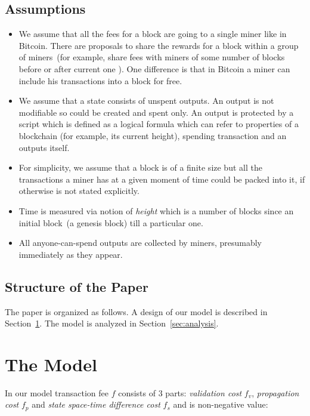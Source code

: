 \documentclass[]{llncs}   %
\newcommand{\authnote}[2]{\marginpar{\parbox{\marginparwidth}{\tiny %
  \textsf{#1 {\textcolor{blue}{notes: #2}}}}}%
  \textcolor{blue}{\textbf{\dag}}}
\newcommand{\authnote}[2]{
  \textsf{#1 \textcolor{blue}{: #2}}}
\newcommand{\authnote}[2]{}
\newcommand{\knote}[1]{{\authnote{\textcolor{green}{Alex notes}}{#1}}}
\begin{document}
\knote{note that we're talking about minimal fees}

\subsection{Assumptions}
\begin{itemize}
  \item{} We assume that all the fees for a block are going to a single miner like in Bitcoin. There are proposals to share the rewards for a block within a group of miners~(for example, share fees with miners of some number of blocks before or after current one \cite{eyal2016bitcoin,kogias2016enhancing}). One difference is that in Bitcoin a miner can include his transactions into a block for free.
  \item{} We assume that a state consists of unspent outputs. An output is not modifiable so could be created and spent only. An output is protected by a script which is defined as a logical formula which can refer to properties of a blockchain (for example, its current height), spending transaction and an outputs itself. \knote{example} 
  \item{} For simplicity, we assume that a block is of a finite size but all the transactions a miner has at a given moment of time could be packed into it, if otherwise is not stated explicitly.
  \item{} Time is measured via notion of \textit{height} which is a number of blocks since an initial block~(a genesis block) till a particular one. 
  \item{} All anyone-can-spend outputs are collected by miners, presumably immediately as they appear.
\end{itemize}

\subsection{Structure of the Paper}

The paper is organized as follows. A design of our model is described in Section~\ref{sec:model}. The model is analyzed in Section~\ref{sec:analysis}.  
\knote{finish}


\section{The Model}
\label{sec:model}

In our model transaction fee $f$ consists of 3 parts: \textit{validation cost} $f_v$, \textit{propagation cost} $f_p$ and \textit{state space-time difference cost} $f_s$ and is non-negative value:
\end{document}
